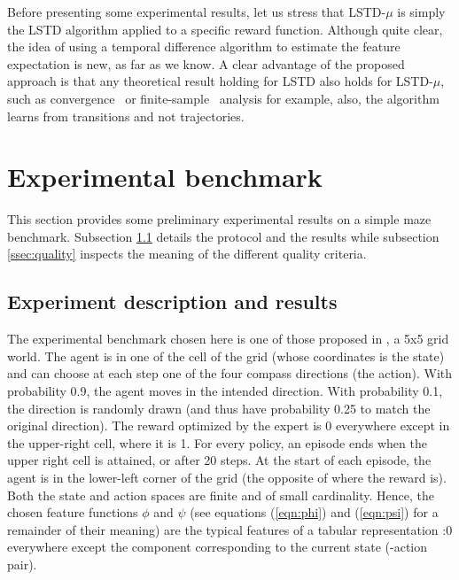 \documentclass{jfpda2011}
\begin{document}
Before presenting some experimental results, let us stress that
LSTD-$\mu$ is simply the LSTD algorithm applied to a specific reward
function. Although quite clear, the idea of using a temporal
difference algorithm to estimate the feature expectation is new, as
far as we know. A clear advantage of the proposed approach is that
any theoretical result holding for LSTD also holds for LSTD-$\mu$,
such as convergence~\citep{nedic2003least} or
finite-sample~\citep{lazaric2010finiteLSTD} analysis for example, also, the algorithm learns from transitions and not trajectories.

\section{Experimental benchmark}
\label{sec:exp}
This section provides some preliminary experimental results on a simple maze benchmark. Subsection \ref{ssec:exp} details the protocol and the results while subsection \ref{ssec:quality} inspects the meaning of the different quality criteria. 
\subsection{Experiment description and results}
\label{ssec:exp}
The experimental benchmark chosen here is one of those proposed in \citep{ng2000algorithms}, a 5x5 grid world. The agent is in one of the cell of the grid (whose coordinates is the state) and can choose at each step one of the four compass directions (the action). With probability 0.9, the agent moves in the intended direction. With probability 0.1, the direction is randomly drawn (and thus have probability 0.25 to match the original direction). The reward optimized by the expert is 0 everywhere except in the upper-right cell, where it is 1. For every policy, an episode ends when the upper right cell is attained, or after 20 steps. At the start of each episode, the agent is in the lower-left corner of the grid (the opposite of where the reward is).\\

Both the state and action spaces are finite and of small cardinality. Hence, the chosen feature functions $\phi$ and $\psi$ (see equations (\ref{eqn:phi}) and (\ref{eqn:psi}) for a remainder of their meaning) are the typical features of a tabular representation :0 everywhere except the component corresponding to the current state (-action pair).\\
\end{document}
